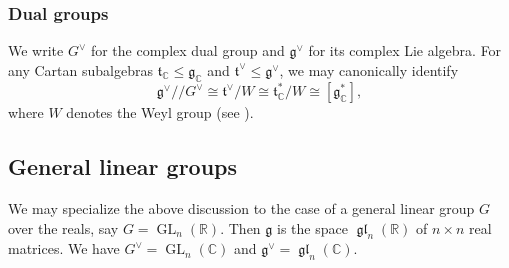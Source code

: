 \documentclass[reqno]{amsart}
\DeclareMathOperator{\glLie}{\mathfrak{g}\mathfrak{l}}
\DeclareMathOperator{\GL}{GL}
\newcommand{\git}{/\!\!/}
\theoremstyle{plain} \newtheorem{theorem} {Theorem}
\theoremstyle{definition} \newtheorem{definition} [theorem] {Definition}
\theoremstyle{itplain} %
\numberwithin{equation}{section}
\numberwithin{theorem}{section}
\renewcommand{\leq}{\leqslant}
\begin{document}
\subsubsection{Dual groups}
We write $G^\vee$ for the complex dual group and $\mathfrak{g}^\vee$ for its complex Lie algebra.  For any Cartan subalgebras $\mathfrak{t}_\mathbb{C} \leq \mathfrak{g}_\mathbb{C}$ and $\mathfrak{t}^\vee \leq \mathfrak{g}^\vee$, we may canonically identify
\begin{equation}\label{eqn:inf-chars-via-langlands-params}
  \mathfrak{g}^\vee \git G^\vee
  \cong \mathfrak{t}^\vee / W
  \cong \mathfrak{t}_\mathbb{C}^*/W \cong [\mathfrak{g}_\mathbb{C}^*],
\end{equation}
where $W$ denotes the Weyl group (see \cite[\S15.1]{nelson-venkatesh-1}).



\subsection{General linear groups}\label{sec:gener-line-groups}
We may specialize the above discussion to the case of a general linear group $G$ over the reals, say $G = \GL_n(\mathbb{R})$.  Then $\mathfrak{g}$ is the space $\glLie_n(\mathbb{R})$ of $n \times n$ real matrices.  We have $G^\vee = \GL_n(\mathbb{C})$ and $\mathfrak{g}^\vee = \glLie_n(\mathbb{C})$.
\end{document}
